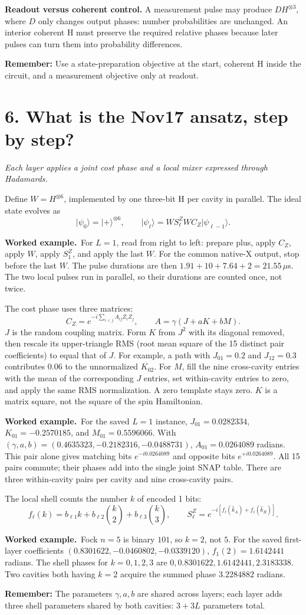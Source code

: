 \documentclass[11pt]{article}
\newcommand{\ket}[1]{\lvert#1\rangle}
\newcommand{\lesson}[2]{\section*{\color{ink}#1}\addcontentsline{toc}{section}{#1}\noindent\textit{#2}\par\medskip}
\newcommand{\example}{\par\medskip\noindent\textbf{Worked example.}\ }
\newcommand{\takeaway}[1]{\par\medskip\noindent\textbf{Remember:} #1\par}
\begin{document}
\textbf{Readout versus coherent control.} A measurement pulse may produce
$D H^{\otimes3}$, where $D$ only changes output phases: number probabilities
are unchanged. An interior coherent H must preserve the required relative
phases because later pulses can turn them into probability differences.
\takeaway{Use a state-preparation objective at the start, coherent H inside the circuit, and a measurement objective only at readout.}

\clearpage
\lesson{6. What is the Nov17 ansatz, step by step?}{Each layer applies a joint cost phase and a local mixer expressed through Hadamards.}
Define $W=H^{\otimes6}$, implemented by one three-bit H per cavity in parallel.
The ideal state evolves as
\begin{equation}
 \boxed{\ket{\psi_0}=\ket+^{\otimes6},\qquad
 \ket{\psi_\ell}=W S_\ell^Z W C_Z\ket{\psi_{\ell-1}}.}
\end{equation}
\example For $L=1$, read from right to left: prepare plus, apply $C_Z$,
apply $W$, apply $S_1^Z$, and apply the last $W$. For the common native-X
output, stop before the last $W$. The pulse durations are then
$1.91+10+7.64+2=21.55\,\mu$s. The two local pulses run in parallel,
so their durations are counted once, not twice.

The cost phase uses three matrices:
\begin{equation}
 C_Z=e^{-i\sum_{i<j} A_{ij}Z_iZ_j},\qquad
 A=\gamma(J+aK+bM).
\end{equation}
$J$ is the random coupling matrix. Form $K$ from $J^2$ with its diagonal
removed, then rescale its upper-triangle RMS (root mean square of the
15 distinct pair coefficients) to equal that of $J$.
For example, a path with $J_{01}=0.2$ and $J_{12}=0.3$ contributes
$0.06$ to the unnormalized $K_{02}$. For $M$, fill the nine cross-cavity entries with the mean of the corresponding
$J$ entries, set within-cavity entries to zero, and apply the same RMS
normalization. A zero template stays zero. $K$ is a matrix square, not the
square of the spin Hamiltonian.

\example For the saved $L=1$ instance, $J_{01}=0.0282334$,
$K_{01}=-0.2570185$, and $M_{01}=0.5596066$.
With $(\gamma,a,b)=(0.4635323,-0.2182316,-0.0488731)$,
$A_{01}=0.0264089$ radians. This pair alone gives matching bits
$e^{-i0.0264089}$ and opposite bits $e^{+i0.0264089}$.
All 15 pairs commute; their phases add into the single joint SNAP table.
There are three within-cavity pairs per cavity and nine cross-cavity pairs.

The local shell counts the number $k$ of encoded 1 bits:
\begin{equation}
 f_\ell(k)=b_{\ell1}k+b_{\ell2}\binom{k}{2}+b_{\ell3}\binom{k}{3},
 \qquad S_\ell^Z=e^{-i[f_\ell(\hat k_A)+f_\ell(\hat k_B)]}.
\end{equation}
\example Fock $n=5$ is binary $101$, so $k=2$, not $5$.
For the saved first-layer coefficients $(0.8301622,-0.0460802,-0.0339120)$,
$f_1(2)=1.6142441$ radians. The shell phases for $k=0,1,2,3$ are
$0,0.8301622,1.6142441,2.3183338$. Two cavities both having $k=2$
acquire the summed phase $3.2284882$ radians.
\takeaway{The parameters $\gamma,a,b$ are shared across layers; each layer adds three shell parameters shared by both cavities: $3+3L$ parameters total.}
\end{document}
